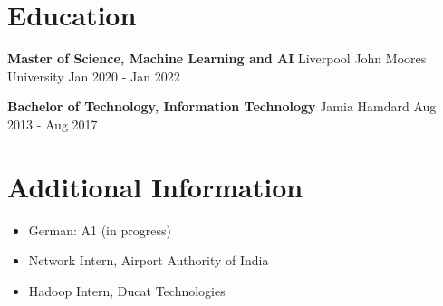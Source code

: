 \documentclass[10pt,a4paper]{article}
\begin{document}
\section{Education}
\textbf{Master of Science, Machine Learning and AI} \textbar{} Liverpool John Moores University \hfill Jan 2020 - Jan 2022\par
\textbf{Bachelor of Technology, Information Technology} \textbar{} Jamia Hamdard \hfill Aug 2013 - Aug 2017\par

\section{Additional Information}
\begin{itemize}
  \item German: A1 (in progress)
  \item Network Intern, Airport Authority of India
  \item Hadoop Intern, Ducat Technologies
\end{itemize}
\end{document}
